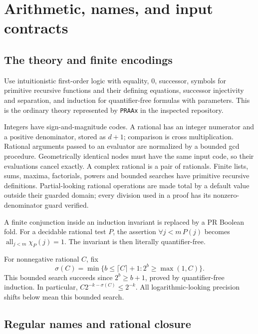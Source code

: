 \documentclass[11pt]{article}
\theoremstyle{definition}
\newcommand{\code}[1]{\texttt{#1}}
\begin{document}
\section{Arithmetic, names, and input contracts}\label{sec:data}

\subsection{The theory and finite encodings}

Use intuitionistic first-order logic with equality, \(0\), successor,
symbols for primitive recursive functions and their defining equations,
successor injectivity and separation, and induction for quantifier-free
formulas with parameters. This is the ordinary theory represented by
\code{PRAAx} in the inspected repository.

Integers have sign-and-magnitude codes. A rational has an integer numerator
and a positive denominator, stored as \(d+1\); comparison is cross
multiplication. Rational arguments passed to an evaluator are normalized
by a bounded gcd procedure. Geometrically identical nodes must have the
same input code, so their evaluations cancel exactly. A complex rational
is a pair of rationals. Finite lists, sums, maxima, factorials, powers
and bounded searches have primitive recursive definitions.
Partial-looking rational operations are made total by a default value
outside their guarded domain; every division used in a proof has its
nonzero-denominator guard verified.

A finite conjunction inside an induction invariant is replaced by a PR
Boolean fold. For a decidable rational test \(P\), the assertion
\(\forall j<m\,P(j)\) becomes
\(\operatorname{all}_{j<m}\chi_P(j)=1\). The invariant is then literally
quantifier-free.

For nonnegative rational \(C\), fix
\begin{equation}\label{eq:sigma}
 \sigma(C)=\min\{b\le\lceil C\rceil+1:2^b\ge\max(1,C)\}.
\end{equation}
This bounded search succeeds since \(2^b\ge b+1\), proved by
quantifier-free induction. In particular,
\(C2^{-k-\sigma(C)}\le2^{-k}\).
All logarithmic-looking precision shifts below mean this bounded search.

\subsection{Regular names and rational closure}
\end{document}

